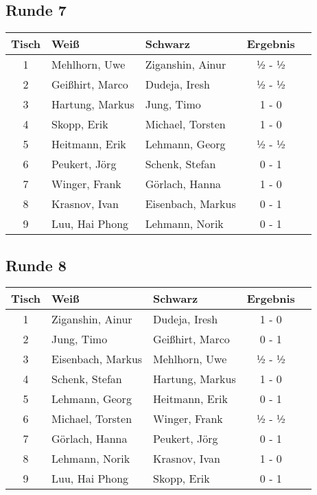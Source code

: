 \documentclass[a4paper,ngerman]{tui-algo-seminar}
\begin{document}
\subsection{Runde 7}
\begin{center}
\begin{tabular}{cllcl}
\toprule
\textbf{Tisch} & \textbf{Weiß} & \textbf{Schwarz} & \textbf{Ergebnis} \\
\midrule
1 & Mehlhorn, Uwe & Ziganshin, Ainur & ½ - ½ \\
2 & Geißhirt, Marco & Dudeja, Iresh & ½ - ½ \\
3 & Hartung, Markus & Jung, Timo & 1 - 0 \\
4 & Skopp, Erik & Michael, Torsten & 1 - 0 \\
5 & Heitmann, Erik & Lehmann, Georg & ½ - ½ \\
6 & Peukert, Jörg & Schenk, Stefan & 0 - 1 \\
7 & Winger, Frank & Görlach, Hanna & 1 - 0 \\
8 & Krasnov, Ivan & Eisenbach, Markus & 0 - 1 \\
9 & Luu, Hai Phong & Lehmann, Norik & 0 - 1 \\
\bottomrule
\end{tabular}
\end{center}

\subsection{Runde 8}
\begin{center}
\begin{tabular}{cllcl}
\toprule
\textbf{Tisch} & \textbf{Weiß} & \textbf{Schwarz} & \textbf{Ergebnis} \\
\midrule
1 & Ziganshin, Ainur & Dudeja, Iresh & 1 - 0 \\
2 & Jung, Timo & Geißhirt, Marco & 0 - 1 \\
3 & Eisenbach, Markus & Mehlhorn, Uwe & ½ - ½ \\
4 & Schenk, Stefan & Hartung, Markus & 1 - 0 \\
5 & Lehmann, Georg & Heitmann, Erik & 0 - 1 \\
6 & Michael, Torsten & Winger, Frank & ½ - ½ \\
7 & Görlach, Hanna & Peukert, Jörg & 0 - 1 \\
8 & Lehmann, Norik & Krasnov, Ivan & 1 - 0 \\
9 & Luu, Hai Phong & Skopp, Erik & 0 - 1 \\
\bottomrule
\end{tabular}
\end{center}
\end{document}
